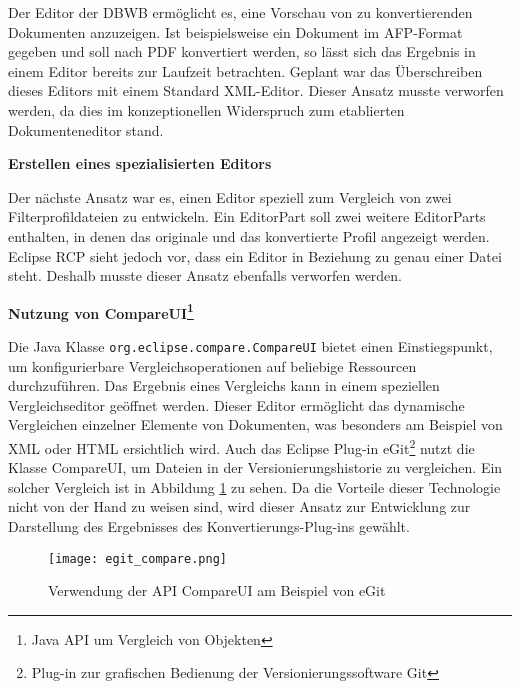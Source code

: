 {{{{Der Editor der \ac{DBWB} ermöglicht es, eine Vorschau von zu konvertierenden Dokumenten anzuzeigen. Ist beispielsweise ein Dokument im \ac{AFP}-Format gegeben und soll nach \ac{PDF} konvertiert werden, so lässt sich das Ergebnis in einem Editor bereits zur Laufzeit betrachten. Geplant war das Überschreiben dieses Editors mit einem Standard XML-Editor. Dieser Ansatz musste verworfen werden, da dies im konzeptionellen Widerspruch zum etablierten Dokumenteneditor stand.

}

\textbf{Erstellen eines spezialisierten Editors}{

Der nächste Ansatz war es, einen Editor speziell zum Vergleich von zwei Filterprofildateien zu entwickeln. Ein EditorPart soll zwei weitere EditorParts enthalten, in denen das originale und das konvertierte Profil angezeigt werden. Eclipse \ac{RCP} sieht jedoch vor, dass ein Editor in Beziehung zu genau einer Datei steht. Deshalb musste dieser Ansatz ebenfalls verworfen werden. 

}

\textbf{Nutzung von CompareUI\footnote{Java \ac{API}
 um Vergleich von Objekten}}{
 
 Die Java Klasse \texttt{org.eclipse.compare.CompareUI} bietet einen Einstiegspunkt, um konfigurierbare Vergleichsoperationen auf beliebige Ressourcen durchzuführen. Das Ergebnis eines Vergleichs kann in einem speziellen Vergleichseditor geöffnet werden. Dieser Editor ermöglicht das dynamische Vergleichen einzelner Elemente von Dokumenten, was besonders am Beispiel von \ac{XML} oder \ac{HTML} ersichtlich wird. Auch das Eclipse Plug-in eGit\footnote{Plug-in zur grafischen Bedienung der Versionierungssoftware Git} nutzt die Klasse CompareUI, um Dateien in der Versionierungshistorie zu vergleichen. Ein solcher Vergleich ist in Abbildung \ref{fig:egit_compare} zu sehen. Da die Vorteile dieser Technologie nicht von der Hand zu weisen sind, wird dieser Ansatz zur Entwicklung zur Darstellung des Ergebnisses des Konvertierungs-Plug-ins gewählt.

\begin{figure}[htbp] 
  \centering
     \texttt{[image: egit\_compare.png]}
  \caption{Verwendung der API CompareUI am Beispiel von eGit}
  \label{fig:egit_compare}
\end{figure}

}



}

}






}
